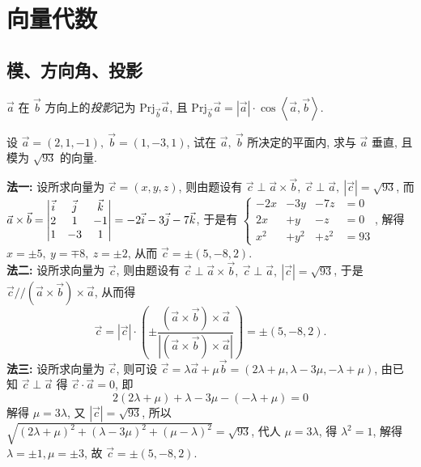 \section{向量代数}

\subsection{模、方向角、投影}

\begin{definition}[投影]
    $\vec{a}$ 在 $\vec{b}$ 方向上的\textit{投影}记为 $\mathrm{Prj}_{\vec{b} } \vec{a}$, 
    且 $\mathrm{Prj}_{\vec{b} } \vec{a}=|\vec{a}| \cdot \cos\left \langle \vec{a},\vec{b} \right \rangle .$
\end{definition}

\begin{example}
    设 $\vec{a}=(2,1,-1),~\vec{b}=(1,-3,1)$, 试在 $\vec{a},~\vec{b}$ 所决定的平面内, 求与 $\vec{a}$ 垂直, 且模为 $\sqrt{93}$ 的向量.
\end{example}
\begin{solution}
    \textbf{法一: }设所求向量为 $ \vec{c}=(x, y, z)$, 则由题设有 $ \vec{c} \perp \vec{a} \times \vec{b},~ \vec{c} \perp \vec{a},~|\vec{c}|=\sqrt{93}$, 
    而 $ \vec{a} \times \vec{b}=\mqty|\vec{i} & \vec{j} & \vec{k} \\ 2 & 1 & -1 \\ 1 & -3 & 1|=-2 \vec{i}-3 \vec{j}-7 \vec{k}$, 于是有
    $\left\{\begin{array}{llll}
            -2x & -3y  & -7z  & =0  \\
            2x  & +y   & -z   & =0  \\
            x^2 & +y^2 & +z^2 & =93
        \end{array}\right.$, 解得 $ x=\pm 5,~ y=\mp 8,~ z=\pm 2 $, 从而 $ \vec{c}=\pm(5,-8,2) .$\\
    \textbf{法二: }设所求向量为 $ \vec{c}$, 则由题设有 $ \vec{c} \perp \vec{a} \times \vec{b},~ \vec{c} \perp \vec{a},~|\vec{c}|=\sqrt{93}$, 
    于是 $ \vec{c} / /(\vec{a} \times \vec{b}) \times \vec{a}$, 从而得
    $$ \vec{c}=\left|\vec{c}\right| \cdot\left(\pm \frac{(\vec{a} \times \vec{b}) \times \vec{a}}{|(\vec{a} \times \vec{b}) \times \vec{a}|}\right)=\pm(5,-8,2) .$$
    \textbf{法三: }设所求向量为 $ \vec{c}$, 则可设 $ \vec{c}=\lambda \vec{a}+\mu \vec{b}=(2 \lambda+\mu, \lambda-3 \mu,-\lambda+\mu)$, 
    由已知 $ \vec{c} \perp \vec{a} $ 得 $ \vec{c} \cdot \vec{a}=0$, 即 $$ 2(2 \lambda+\mu)+\lambda-3 \mu-(-\lambda+\mu)=0$$
    解得 $ \mu=3 \lambda$, 又 $ |\vec{c}|=\sqrt{93}$, 所以 $ \sqrt{(2 \lambda+\mu)^{2}+(\lambda-3 \mu)^{2}+(\mu-\lambda)^{2}}=\sqrt{93}$, 
    代人 $ \mu=3 \lambda$, 得 $ \lambda^{2}=1$, 解得 $ \lambda=\pm 1, \mu=\pm 3$, 故 $ \vec{c}=\pm(5,-8,2) .$
\end{solution}

